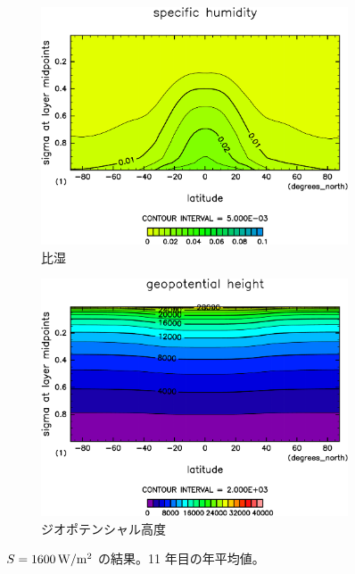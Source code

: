 \documentclass[body]{subfiles}
\begin{document}
\begin{figure}[t]
\begin{subfigure}{.4\textwidth}
		\includegraphics[width=\columnwidth]{S1600/QH2OVap,time=3650:4015-crop-rotate.pdf}
		\caption{比湿}\label{S1600比湿}
	\end{subfigure}
	\begin{subfigure}{.4\textwidth}
		\centering
		\includegraphics[width=\columnwidth]{S1600/Height,time=3650:4015-crop-rotate.pdf}
		\caption{ジオポテンシャル高度}\label{S1600ジオポテンシャル高度}
	\end{subfigure}
	\caption{
		\(S=1600\hmu{W/m^2}\) の結果。11 年目の年平均値。
	}\label{S1600}
\end{figure}
\end{document}
